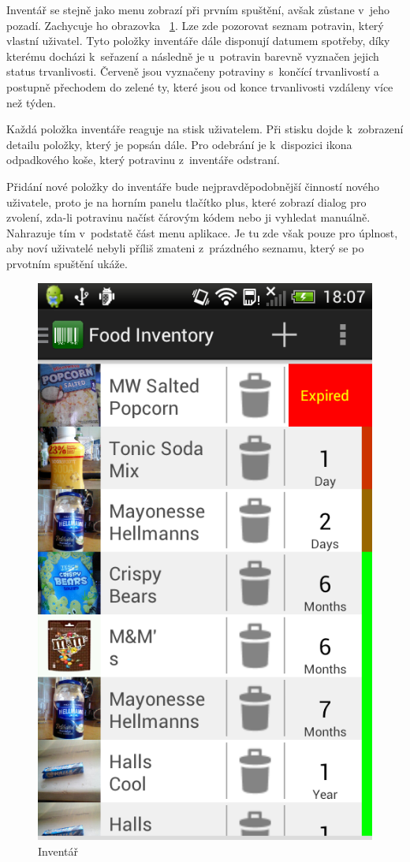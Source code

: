 \documentclass[thesis=B,czech]{FITthesis}[2013/10/20]
\begin{document}
Inventář se stejně jako menu zobrazí při prvním spuštění, avšak zůstane v~jeho pozadí. Zachycuje ho obrazovka ~\ref{fig:AppInventory}. Lze zde pozorovat seznam potravin, který vlastní uživatel. Tyto položky inventáře dále disponují datumem spotřeby, díky kterému docházi k~seřazení a následně je u~potravin barevně vyznačen jejich status trvanlivosti. Červeně jsou vyznačeny potraviny s~končící trvanlivostí a postupně přechodem do zelené ty, které jsou od konce trvanlivosti vzdáleny více než týden.

Každá položka inventáře reaguje na stisk uživatelem. Při stisku dojde k~zobrazení detailu položky, který je popsán dále. Pro odebrání je k~dispozici ikona odpadkového koše, který potravinu z~inventáře odstraní.

Přidání nové položky do inventáře bude nejpravděpodobnější činností nového uživatele, proto je na horním panelu tlačítko plus, které zobrazí dialog pro zvolení, zda-li potravinu načíst čárovým kódem nebo ji vyhledat manuálně. Nahrazuje tím v~podstatě část menu aplikace. Je tu zde však pouze pro úplnost, aby noví uživatelé nebyli příliš zmateni z~prázdného seznamu, který se po prvotním spuštění ukáže.

\begin{figure}[H]
  \centering
  \includegraphics[scale=0.4]{screenshots/app_inventory.png}
  \caption{Inventář}
  \label{fig:AppInventory}
\end{figure}
\end{document}
